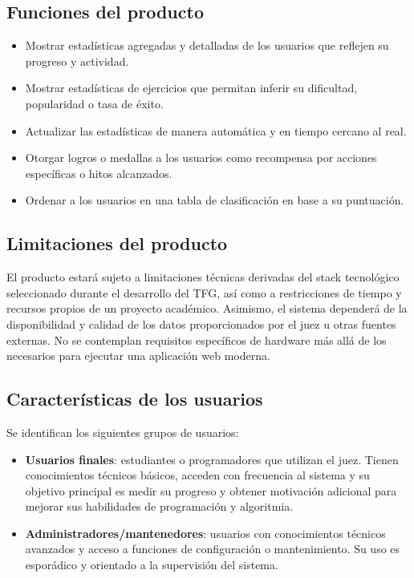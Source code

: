 \subsection{Funciones del producto}

\begin{itemize}
    \item Mostrar estadísticas agregadas y detalladas de los usuarios que reflejen su progreso y actividad.
    \item Mostrar estadísticas de ejercicios que permitan inferir su dificultad, popularidad o tasa de éxito.
    \item Actualizar las estadísticas de manera automática y en tiempo cercano al real.
    \item Otorgar logros o medallas a los usuarios como recompensa por acciones específicas o hitos alcanzados.
    \item Ordenar a los usuarios en una tabla de clasificación en base a su puntuación.
\end{itemize}

\subsection{Limitaciones del producto}

El producto estará sujeto a limitaciones técnicas derivadas del stack tecnológico seleccionado durante el desarrollo del TFG, así como a restricciones de tiempo y recursos propios de un proyecto académico. Asimismo, el sistema dependerá de la disponibilidad y calidad de los datos proporcionados por el juez \aer u otras fuentes externas. No se contemplan requisitos específicos de hardware más allá de los necesarios para ejecutar una aplicación web moderna.

\subsection{Características de los usuarios}

Se identifican los siguientes grupos de usuarios:

\begin{itemize}
    \item \textbf{Usuarios finales}: estudiantes o programadores que utilizan el juez. Tienen conocimientos técnicos básicos, acceden con frecuencia al sistema y su objetivo principal es medir su progreso y obtener motivación adicional para mejorar sus habilidades de programación y algoritmia.
    \item \textbf{Administradores/mantenedores}: usuarios con conocimientos técnicos avanzados y acceso a funciones de configuración o mantenimiento. Su uso es esporádico y orientado a la supervisión del sistema.
\end{itemize}

